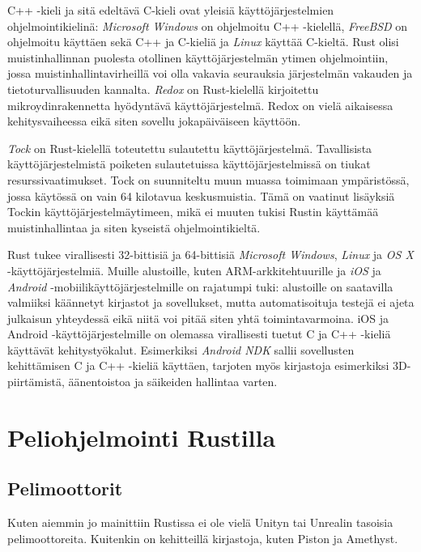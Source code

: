 \documentclass[finnish]{tktltiki2}
\theoremstyle{definition}
\theoremstyle{remark}
\begin{document}
C++ -kieli ja sitä edeltävä C-kieli ovat yleisiä käyttöjärjestelmien ohjelmointikielinä: \textit{Microsoft Windows} on ohjelmoitu C++ -kielellä, \textit{FreeBSD} on ohjelmoitu käyttäen sekä C++ ja C-kieliä ja \textit{Linux} käyttää C-kieltä. Rust olisi muistinhallinnan puolesta otollinen käyttöjärjestelmän ytimen ohjelmointiin, jossa muistinhallintavirheillä voi olla vakavia seurauksia järjestelmän vakauden ja tietoturvallisuuden kannalta. \textit{Redox} on Rust-kielellä kirjoitettu mikroydinrakennetta hyödyntävä käyttöjärjestelmä.\cite{WhatRedoxIs} Redox on vielä aikaisessa kehitysvaiheessa eikä siten sovellu jokapäiväiseen käyttöön.

\textit{Tock} on Rust-kielellä toteutettu sulautettu käyttöjärjestelmä.\cite{OwnershipIsTheft} Tavallisista käyttöjärjestelmistä poiketen sulautetuissa käyttöjärjestelmissä on tiukat resurssivaatimukset. Tock on suunniteltu muun muassa toimimaan ympäristössä, jossa käytössä on vain 64 kilotavua keskusmuistia. Tämä on vaatinut lisäyksiä Tockin käyttöjärjestelmäytimeen, mikä ei muuten tukisi Rustin käyttämää muistinhallintaa ja siten kyseistä ohjelmointikieltä.

Rust tukee virallisesti 32-bittisiä ja 64-bittisiä \textit{Microsoft Windows}, \textit{Linux} ja \textit{OS X} -käyttöjärjestelmiä.\cite{RustPlatformSupport} Muille alustoille, kuten ARM-arkkitehtuurille ja \textit{iOS} ja \textit{Android} -mobiilikäyttöjärjestelmille on rajatumpi tuki: alustoille on saatavilla valmiiksi käännetyt kirjastot ja sovellukset, mutta automatisoituja testejä ei ajeta julkaisun yhteydessä eikä niitä voi pitää siten yhtä toimintavarmoina. iOS ja Android -käyttöjärjestelmille on olemassa virallisesti tuetut C ja C++ -kieliä käyttävät kehitystyökalut. Esimerkiksi \textit{Android NDK} sallii sovellusten kehittämisen C ja C++ -kieliä käyttäen, tarjoten myös kirjastoja esimerkiksi 3D-piirtämistä, äänentoistoa ja säikeiden hallintaa varten.\cite{AndroidNDK}

\section{Peliohjelmointi Rustilla}

\subsection{Pelimoottorit}
Kuten aiemmin jo mainittiin Rustissa ei ole vielä Unityn tai Unrealin tasoisia pelimoottoreita. Kuitenkin on kehitteillä kirjastoja, kuten Piston ja Amethyst. 
\end{document}
